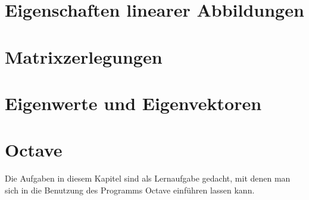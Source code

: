 \documentclass[a4paper,12pt]{book}
\begin{document}
\chapter{Eigenschaften linearer Abbildungen}

\chapter{Matrixzerlegungen}

\chapter{Eigenwerte und Eigenvektoren}

\chapter{Octave}
Die Aufgaben in diesem Kapitel sind als Lernaufgabe gedacht, mit denen
man sich in die Benutzung des Programms Octave einführen lassen kann.

\bigskip

\closethemaindex
\printthemata

\end{document}
